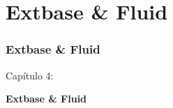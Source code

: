 %

\section{Extbase \& Fluid}
\begin{frame}[fragile]
	\frametitle{Extbase \& Fluid}

	\begin{center}\huge{Capítulo 4:}\end{center}
	\begin{center}\huge{\color{typo3darkgrey}\textbf{Extbase \& Fluid}}\end{center}

\end{frame}


